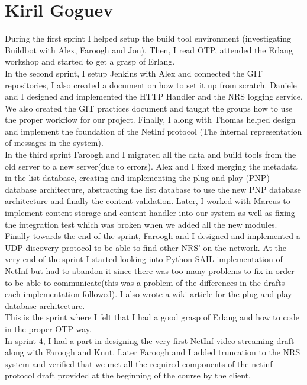 \section{Kiril Goguev}

During the first sprint I helped setup the build tool environment (investigating Buildbot with Alex, Faroogh and Jon). Then, I read OTP, attended the Erlang workshop and started to get a grasp of Erlang.\\

In the second sprint, I setup Jenkins with Alex and connected the GIT repositories, I also created a document on how to set it up from scratch. 
Daniele and I designed and implemented the HTTP Handler and the NRS logging service. We also created the GIT practices document and taught the groups how to use the proper workflow for our project. Finally,
I along with Thomas helped design and implement the foundation of the NetInf protocol (The internal representation of messages in the system).\\


In the third sprint
Faroogh and I migrated all the data and build tools from the old server to a new server(due to errors).
Alex and I fixed merging the metadata in the list database, creating and implementing the plug and play (PNP) database architecture, abstracting the list database to use the new PNP database architecture and finally the content validation. 
Later, I worked with Marcus to implement content storage and content handler into our system as well as fixing the integration test which was broken when we added all the new modules. 
Finally towards the end of the sprint, Faroogh and I designed and implemented a UDP discovery protocol to be able to find other NRS' on the network.
At the very end of the sprint I started looking into Python SAIL implementation of NetInf but had to abandon it since there was too many problems to fix in order to be able to communicate(this was a problem of the differences in the drafts each implementation followed). 
I also wrote a wiki article for the plug and play database architecture.\\

This is the sprint where I felt that I had a good grasp of Erlang and how to code in the proper OTP way. \\

In sprint 4,
I had a part in designing the very first NetInf video streaming draft along with Faroogh and Knut. 
Later Faroogh and I added truncation to the NRS system and verified that we met all the required components of the netinf protocol draft provided at the beginning of the course by the client. \\

